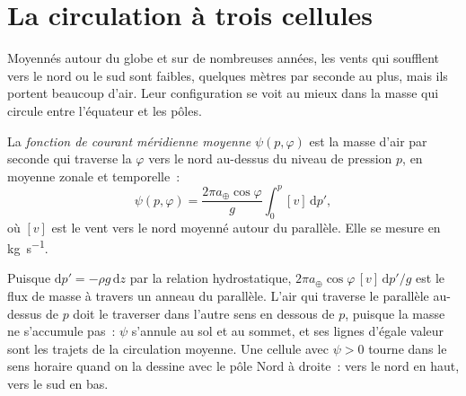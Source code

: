 \section{La circulation à trois cellules}\label{sec:b1:atmospheric-circulation:cells}

Moyennés autour du globe et sur de nombreuses années, les vents qui soufflent vers le nord ou le sud sont
faibles, quelques mètres par seconde au plus, mais ils portent beaucoup d'air. Leur configuration se voit
au mieux dans la masse qui circule entre l'équateur et les pôles.

\begin{definition}\label{def:b1:atmospheric-circulation:streamfunction}
La \emph{fonction de courant méridienne moyenne}
$\psi(p, \varphi)$ est la masse d'air par seconde qui traverse la 
$\varphi$ vers le nord au-dessus du niveau de pression $p$, en moyenne zonale et temporelle~:
\[
  \psi(p, \varphi) = \frac{2\pi a_\oplus\cos\varphi}{g}\int_0^p [v]\,\mathrm dp' ,
\]
où $[v]$ est le vent vers le nord moyenné autour du parallèle. Elle se mesure en
\unit{kg.s^{-1}}.
\end{definition}

Puisque $\mathrm dp' = -\rho g\,\mathrm dz$ par la relation hydrostatique, $2\pi a_\oplus
\cos\varphi\,[v]\,\mathrm dp'/g$ est le flux de masse à travers un anneau du parallèle.
L'air qui traverse le parallèle au-dessus de $p$ doit le traverser dans l'autre sens en dessous de $p$, puisque la masse
ne s'accumule pas~: $\psi$ s'annule au sol et au sommet, et ses lignes d'égale
valeur sont les trajets de la circulation moyenne. Une cellule avec $\psi > 0$ tourne dans le sens horaire
quand on la dessine avec le pôle Nord à droite~: vers le nord en haut, vers le sud en bas.

